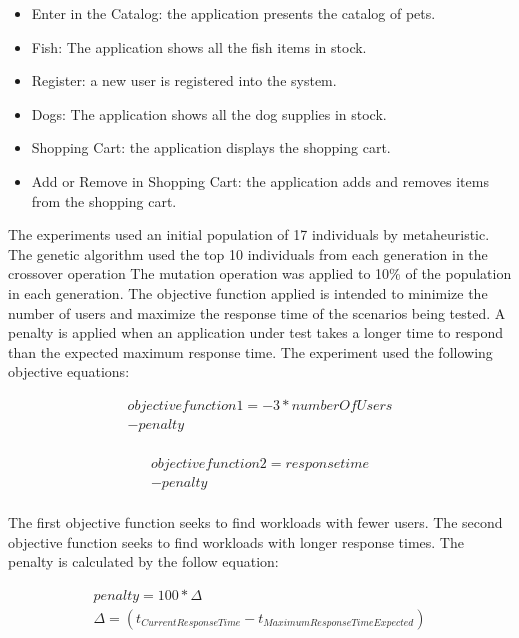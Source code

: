 \documentclass{report}
\begin{document}
\begin{itemize}
\item Enter in the Catalog: the application presents the catalog of pets.
\item Fish: The application shows all the fish items in stock.
\item Register:  a new user is registered into the system.
\item Dogs: The application shows all the dog supplies in stock.
\item Shopping Cart: the application displays the shopping cart.
\item Add or Remove in Shopping Cart: the application adds and removes items from the shopping cart.
\end{itemize}

The experiments used an initial population of 17 individuals by metaheuristic. The genetic algorithm used the top 10 individuals from each generation in the crossover operation  The mutation operation was applied to 10\% of the population in each generation. The objective function applied is intended to minimize the number of users and maximize the response time of the scenarios being tested. A penalty is applied when an application under test takes a longer time to respond than the expected maximum response time. The experiment used the following objective equations:

\begin{equation}
\begin{aligned}
objective function 1 =-3*numberOfUsers\\
-penalty\\
\end{aligned}
\end{equation}


\begin{equation}
\begin{aligned}
objective function 2 =responsetime\\
-penalty\\
\end{aligned}
\end{equation}

The first objective function seeks to find workloads with fewer users. The second objective function seeks to find workloads with  longer response times. The penalty is calculated by the follow equation:

\begin{equation}
\begin{aligned}
penalty=100 * \Delta \\
\Delta=(t_{Current Response Time} - t_{Maximum Response Time Expected})\\
\end{aligned}
\end{equation}
\end{document}
